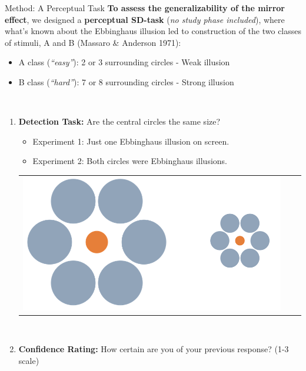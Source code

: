 \documentclass[final]{beamer}
\newlength{\onecolwid}
\begin{document}
\begin{frame}[t]
\begin{columns}[t]
\begin{column}{\onecolwid}
\begin{alertblock}{Method: A Perceptual Task}
\textbf{To assess the generalizability of the mirror effect}, we designed a \textbf{perceptual SD-task} (\textit{no study phase included}), where what's known about the Ebbinghaus illusion led to construction of the two classes of stimuli, A and B (Massaro \& Anderson  1971):
\begin{itemize}
\item A class (\textit{``easy''}): 2 or 3 surrounding circles - Weak illusion
\item B class (\textit{``hard''}): 7 or 8 surrounding circles - Strong illusion
\end{itemize}
$\quad$\\
\begin{enumerate}
\item \textbf{Detection Task:} Are the central circles the same size?\\
\begin{itemize}
\item Experiment 1: Just one Ebbinghaus illusion on screen.
\item Experiment 2: Both circles were Ebbinghaus illusions.\\
\end{itemize}
\begin{center}
\begin{tabular}{ccc}
\includegraphics[width=0.35\linewidth]{Figures/MainTask3.png}
\end{tabular}
\end{center}
$\quad$\\
\item \textbf{Confidence Rating:} How certain are you of your previous response? (1-3 scale)
\end{enumerate}
\end{alertblock}



\end{column}
\end{columns}
\end{frame}
\end{document}
